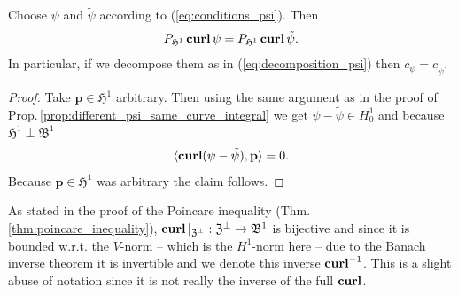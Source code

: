 \documentclass[../master_thesis.tex]{subfiles}
\begin{document}
\begin{proposition}\label{prop:harmonic_part_curlpsi_independent_of_choice}
    Choose $\psi$ and $\tilde{\psi}$ according to (\ref{eq:conditions_psi}). Then
    \begin{align*}
        P_{\mathfrak{H}^1}\veccurl \psi = P_{\mathfrak{H}^1}\veccurl \tilde{\psi}.
    \end{align*}
    In particular, if we decompose them as in (\ref{eq:decomposition_psi}) then 
    $c_\psi = c_{\tilde{\psi}}$.
\end{proposition}
\begin{proof}
    Take $\mathbf{p} \in \mathfrak{H}^1$ arbitrary. Then using the same argument as in the proof 
    of Prop.\,\ref{prop:different_psi_same_curve_integral} we get $\psi - \tilde{\psi} \in H^1_0$ and because 
    $\mathfrak{H}^1 \perp \mathfrak{B}^1$
    \begin{align}
        \langle \veccurl (\psi - \tilde{\psi} ), \mathbf{p} \rangle = 0.
    \end{align}
    Because $\mathbf{p} \in \mathfrak{H}^1$ was arbitrary the claim follows.
\end{proof}

As stated in the proof of the Poincare inequality (Thm.\,\ref{thm:poincare_inequality}), 
$\veccurl| _{\mathfrak{Z}^\perp}: \mathfrak{Z}^\perp \rightarrow \mathfrak{B}^1$
is bijective and since it is bounded w.r.t. the $V$-norm -- which is the 
$H^1$-norm here -- due to the Banach inverse theorem it is invertible and we denote this 
inverse $\veccurl^{-1}$. This is a slight abuse of notation since it is not really 
the inverse of the full $\veccurl$.
\end{document}
